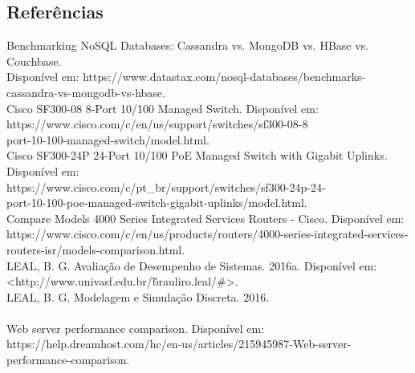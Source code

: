 \begin{center}
    \chapter*{Referências}
\end{center}

\noindent Benchmarking NoSQL Databases: Cassandra vs. MongoDB vs. HBase vs. Couchbase. 
\\ Disponível em: https://www.datastax.com/nosql-databases/benchmarks-cassandra-vs-mongodb-vs-hbase.
\\

\noindent Cisco SF300-08 8-Port 10/100 Managed Switch. Disponível em: 
\\ https://www.cisco.com/c/en/us/support/switches/sf300-08-8
\\ \-port-10-100-managed-switch/model.html.
\\

\noindent Cisco SF300-24P 24-Port 10/100 PoE Managed Switch with Gigabit Uplinks. Disponível em:
\\ https://www.cisco.com/c/pt\_br/support/switches/sf300-24p-24-
\\ port-10-100-poe-managed-switch-gigabit-uplinks/model.html.
\\

\noindent Compare Models 4000 Series Integrated Services Routers - Cisco. Disponível em:
\\ https://www.cisco.com/c/en/us/products/routers/4000-series-integrated-services-routers-isr/models-comparison.html.
\\

\noindent LEAL, B. G. Avaliação de Desempenho de Sistemas. 2016a. Disponível em: 
\\ <http://www.univasf.edu.br/\~brauliro.leal/\#>.
\\

\noindent LEAL, B. G. Modelagem e Simulação Discreta. 2016.
\\
\\

\noindent Web server performance comparison. Disponível em:
\\ https://help.dreamhost.com/hc/en-us/articles/215945987-Web-server-performance-comparison.


